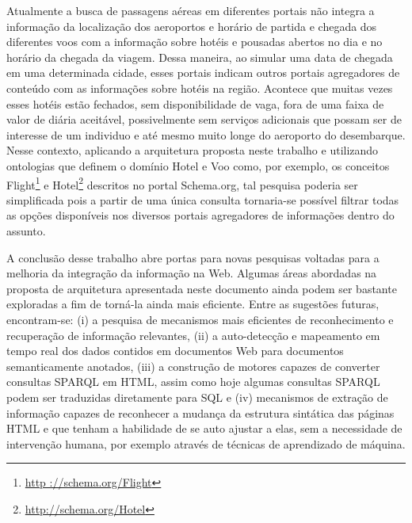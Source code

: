 Atualmente a busca de passagens aéreas em diferentes portais não integra a informação da localização dos aeroportos e horário de partida e chegada dos diferentes voos com a informação sobre hotéis e pousadas abertos no dia e no horário da chegada da viagem. Dessa maneira, ao simular uma data de chegada em uma determinada cidade, esses portais indicam outros portais agregadores de conteúdo com as informações sobre hotéis na região. Acontece que muitas vezes esses hotéis estão fechados, sem disponibilidade de vaga, fora de uma faixa de valor de diária aceitável, possivelmente sem serviços adicionais que possam ser de interesse de um individuo e até mesmo muito longe do aeroporto do desembarque. Nesse contexto, aplicando a arquitetura proposta neste trabalho e utilizando ontologias que definem o domínio Hotel e Voo como, por exemplo, os conceitos Flight\footnote{\url{http      ://schema.org/Flight}} e Hotel\footnote{\url{http://schema.org/Hotel}} descritos no portal Schema.org, tal pesquisa poderia ser simplificada pois a partir de uma única consulta tornaria-se possível filtrar todas as opções disponíveis nos diversos portais agregadores de informações dentro do assunto.

A conclusão desse trabalho abre portas para novas pesquisas voltadas para a melhoria da integração da informação na Web. Algumas áreas abordadas na proposta de arquitetura apresentada neste documento ainda podem ser bastante exploradas a fim de torná-la ainda mais eficiente. Entre as sugestões futuras, encontram-se: (i)  a pesquisa de mecanismos mais eficientes de reconhecimento e recuperação de informação relevantes, (ii) a auto-detecção e mapeamento em tempo real dos dados contidos em documentos Web para documentos semanticamente anotados, (iii) a construção de motores capazes de converter consultas SPARQL em HTML, assim como hoje algumas consultas SPARQL podem ser traduzidas diretamente para SQL e (iv)  mecanismos de extração de informação capazes de reconhecer a mudança da estrutura sintática das páginas HTML e que tenham a habilidade de se auto ajustar a elas, sem a necessidade de intervenção humana, por exemplo através de técnicas de aprendizado de máquina.